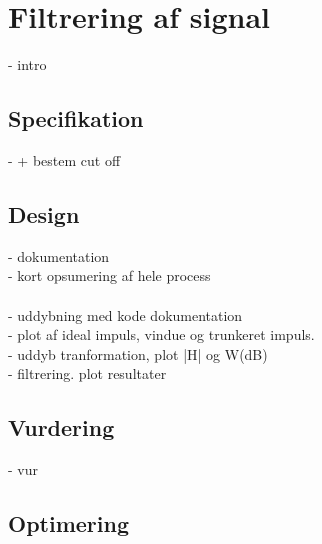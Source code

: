 \chapter{Filtrering af signal}
- intro 
\section{Specifikation}
-  + bestem cut off

\section{Design}
- dokumentation\\
- kort opsumering af hele process\\ 
\\
- uddybning med kode dokumentation\\
- plot af ideal impuls, vindue og trunkeret impuls.\\ 
- uddyb tranformation, plot |H| og W(dB)\\
- filtrering. plot resultater \\



\section{Vurdering}
- vur   

\section{Optimering}
   
